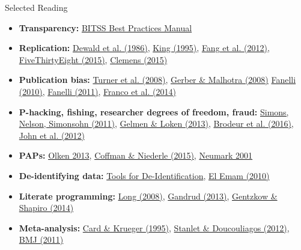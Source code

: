 \documentclass[12pt, compress, handout]{beamer}
\let\noteitem\item %
\renewcommand{\item}{ 
	\noteitem\vspace{\fill}
	}
\begin{document}
\begin{frame}{Selected Reading}
\footnotesize
\begin{itemize}
	\item \textbf{Transparency:} \href{https://github.com/garretchristensen/BestPracticesManual}{BITSS Best Practices Manual}
	\item \textbf{Replication:}  \href{http://www.jstor.org/stable/1806061?seq=1\#fndtn-page\_scan\_tab\_contents}{Dewald et al. (1986)}, \href{http://gking.harvard.edu/files/replication.pdf}{King (1995)}, \href{http://www.pnas.org/content/109/42/17028.long}{Fang et al. (2012)}, \href{https://fivethirtyeight.com/features/science-isnt-broken/}{FiveThirtyEight (2015)}, \href{https://www.cgdev.org/sites/default/files/CGD-Working-Paper-399-Clemens-Meaning-Failed-Replications.pdf}{Clemens (2015)}
	\item \textbf{Publication bias:} \href{http://www.nejm.org/doi/full/10.1056/nejmsa065779}{Turner et al. (2008)}, \href{http://journals.sagepub.com/doi/pdf/10.1177/0049124108318973}{Gerber \& Malhotra (2008)} \href{http://journals.plos.org/plosone/article?id=10.1371/journal.pone.0010068}{Fanelli (2010)}, \href{https://link.springer.com/article/10.1007/s11192-011-0494-7}{Fanelli (2011)}, \href{http://science.sciencemag.org/content/345/6203/1502}{Franco et al. (2014)}
	\item \textbf{P-hacking, fishing, researcher degrees of freedom, fraud:} \href{https://papers.ssrn.com/sol3/papers.cfm?abstract_id=1850704}{Simons, Nelson, Simonsohn (2011)}, \href{http://www.stat.columbia.edu/~gelman/research/unpublished/p_hacking.pdf}{Gelmen \& Loken (2013)}, \href{https://www.aeaweb.org/articles?id=10.1257/app.20150044}{Brodeur et al. (2016)}, \href{https://www.cmu.edu/dietrich/sds/docs/loewenstein/MeasPrevalQuestTruthTelling.pdf}{John et al. (2012)}
	\item \textbf{PAPs:} \href{https://www.aeaweb.org/articles?id=10.1257/jep.29.3.61}{Olken 2013}, \href{https://www.aeaweb.org/articles?id=10.1257/jep.29.3.81}{Coffman \& Niederle (2015)}, \href{http://onlinelibrary.wiley.com/doi/10.1111/0019-8676.00199/full}{Neumark 2001}
	\item \textbf{De-identifying data:} \href{http://www.ehealthinformation.ca/wp-content/uploads/2014/08/2009-Tools-for-De-Identification-of-Personal-Health.pdf}{Tools for De-Identification}, \href{http://www.ehealthinformation.ca/wp-content/uploads/2014/08/2010-Risk-based-de-identification-of-health-data.pdf}{El Emam (2010)}
	\item \textbf{Literate programming:} \href{https://www.amazon.com/Workflow-Data-Analysis-Using-Stata/dp/1597180475}{Long (2008)}, \href{https://www.amazon.com/Reproducible-Research-Studio-Chapman-Hall/dp/1466572841}{Gandrud (2013)}, \href{http://www.brown.edu/Research/Shapiro/pdfs/CodeAndData.pdf}{Gentzkow \& Shapiro (2014)}
	\item \textbf{Meta-analysis:} \href{http://www.jstor.org/stable/2117925?seq=1\#page\_scan\_tab\_contents}{Card \& Krueger (1995)}, \href{https://www.amazon.com/Meta-Regression-Analysis-Economics-Business-Routledge/dp/0415670780}{Stanlet \& Doucouliagos (2012)}, \href{http://www.bmj.com/content/343/bmj.d4002}{BMJ (2011)}
	\end{itemize}


\end{frame}
\end{document}
